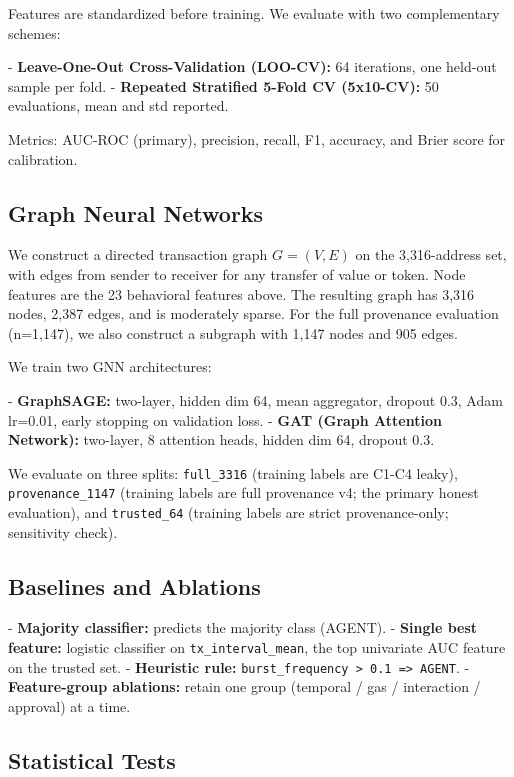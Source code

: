 \documentclass[sigconf,nonacm=false]{acmart}
\begin{document}
Features are standardized before training. We evaluate with two complementary schemes:

- \textbf{Leave-One-Out Cross-Validation (LOO-CV):} 64 iterations, one held-out sample per fold.
- \textbf{Repeated Stratified 5-Fold CV (5x10-CV):} 50 evaluations, mean and std reported.

Metrics: AUC-ROC (primary), precision, recall, F1, accuracy, and Brier score for calibration.

\subsection{Graph Neural Networks}

We construct a directed transaction graph $G = (V, E)$ on the 3,316-address set, with edges from sender to receiver for any transfer of value or token. Node features are the 23 behavioral features above. The resulting graph has 3,316 nodes, 2,387 edges, and is moderately sparse. For the full provenance evaluation (n=1,147), we also construct a subgraph with 1,147 nodes and 905 edges.

We train two GNN architectures:

- \textbf{GraphSAGE:} two-layer, hidden dim 64, mean aggregator, dropout 0.3, Adam lr=0.01, early stopping on validation loss.
- \textbf{GAT (Graph Attention Network):} two-layer, 8 attention heads, hidden dim 64, dropout 0.3.

We evaluate on three splits: \texttt{full\_3316} (training labels are C1-C4 leaky), \texttt{provenance\_1147} (training labels are full provenance v4; the primary honest evaluation), and \texttt{trusted\_64} (training labels are strict provenance-only; sensitivity check).

\subsection{Baselines and Ablations}

- \textbf{Majority classifier:} predicts the majority class (AGENT).
- \textbf{Single best feature:} logistic classifier on \texttt{tx\_interval\_mean}, the top univariate AUC feature on the trusted set.
- \textbf{Heuristic rule:} \texttt{burst\_frequency > 0.1 => AGENT}.
- \textbf{Feature-group ablations:} retain one group (temporal / gas / interaction / approval) at a time.

\subsection{Statistical Tests}
\end{document}

